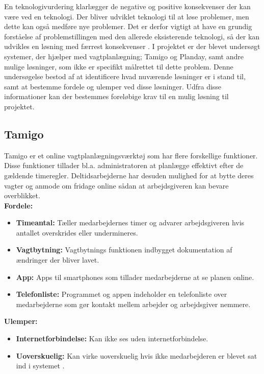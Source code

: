 En teknologivurdering klarlægger de negative og positive konsekvenser der kan være ved en teknologi. Der bliver udviklet teknologi til at løse problemer, men dette kan også medføre nye problemer. Det er derfor vigtigt at have en grundig forståelse af problemstillingen med den allerede eksisterende teknologi, så der kan udvikles en løsning med færrest konsekvenser \citep{ProTek}.
I projektet er der blevet undersøgt systemer, der hjælper med vagtplanlægning; Tamigo og Planday, samt andre mulige løsninger, som ikke er specifikt målrettet til dette problem. Denne undersøgelse bestod af at identificere hvad nuværende løsninger er i stand til, samt at bestemme fordele og ulemper ved disse løsninger. Udfra disse informationer kan der bestemmes foreløbige krav til en mulig løsning til projektet.

\subsection{Tamigo}
Tamigo er et online vagtplanlægningsværktøj som har flere forskellige funktioner. Disse funktioner tillader bl.a. administratoren at planlægge effektivt efter de gældende timeregler. Deltidsarbejderne har desuden mulighed for at bytte deres vagter og anmode om fridage online sådan at arbejdsgiveren kan bevare overblikket.\\

\textbf{Fordele: }
\begin{itemize}
\item {\textbf{Timeantal:} Tæller medarbejdernes timer og advarer arbejdsgiveren hvis antallet overskrides eller undermineres.}
\item {\textbf{Vagtbytning:} Vagtbytnings funktionen indbygget dokumentation af ændringer der bliver lavet.}
\item {\textbf{App:} Apps til smartphones som tillader medarbejderne at se planen online.}
\item {\textbf{Telefonliste:} Programmet og appen indeholder en telefonliste over medarbejderne som gør kontakt mellem arbejder og arbejdsgiver nemmere.}\\
\end{itemize}

\textbf{Ulemper: }
\begin{itemize}
\item {\textbf{Internetforbindelse:} Kan ikke ses uden internetforbindelse.}
\item {\textbf{Uoverskuelig:} Kan virke uoverskuelig hvis ikke medarbejderen er blevet sat ind i systemet \citep{Tamigo, Trustpilot}.}
\end{itemize}

